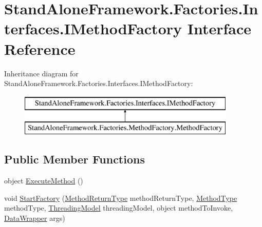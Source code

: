 \hypertarget{interface_stand_alone_framework_1_1_factories_1_1_interfaces_1_1_i_method_factory}{\section{Stand\+Alone\+Framework.\+Factories.\+Interfaces.\+I\+Method\+Factory Interface Reference}
\label{interface_stand_alone_framework_1_1_factories_1_1_interfaces_1_1_i_method_factory}
}
Inheritance diagram for Stand\+Alone\+Framework.\+Factories.\+Interfaces.\+I\+Method\+Factory\+:\begin{figure}[H]
\begin{center}
\leavevmode
\includegraphics[height=2.000000cm]{interface_stand_alone_framework_1_1_factories_1_1_interfaces_1_1_i_method_factory}
\end{center}
\end{figure}
\subsection*{Public Member Functions}
\begin{DoxyCompactItemize}
\item 
object \hyperlink{interface_stand_alone_framework_1_1_factories_1_1_interfaces_1_1_i_method_factory_a699e7a06cdb746034ce0d7b38d9cf21c}{Execute\+Method} ()
\item 
void \hyperlink{interface_stand_alone_framework_1_1_factories_1_1_interfaces_1_1_i_method_factory_aafd802da0b25eaf9e11c53b9c0d06bdf}{Start\+Factory} (\hyperlink{namespace_stand_alone_framework_1_1_factories_1_1_method_factory_a03ffbf0d8e733b86d0ac29ae38dd4241}{Method\+Return\+Type} method\+Return\+Type, \hyperlink{namespace_stand_alone_framework_1_1_factories_1_1_method_factory_aeb6e05dc016e73b072faae5a5d275f6a}{Method\+Type} method\+Type, \hyperlink{namespace_stand_alone_framework_1_1_factories_1_1_thread_factory_aaa02326f96ee10b7d0fd360488d27c39}{Threading\+Model} threading\+Model, object method\+To\+Invoke, \hyperlink{class_stand_alone_framework_1_1_data_wrapper}{Data\+Wrapper} args)
\end{DoxyCompactItemize}
